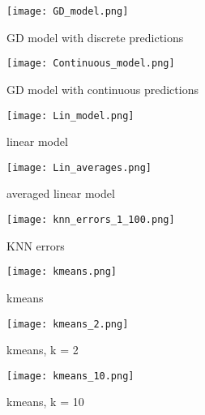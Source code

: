 \documentclass{article}
\begin{document}
\begin{figure}[h]
\centering
\texttt{[image: GD\_model.png]}
\caption{GD model with discrete predictions}
\end{figure}

\begin{figure}[h]
\centering
\texttt{[image: Continuous\_model.png]}
\caption{GD model with continuous predictions}
\end{figure}

\begin{figure}[h]
\centering
\texttt{[image: Lin\_model.png]}
\caption{linear model}
\end{figure}

\begin{figure}[h]
\centering
\texttt{[image: Lin\_averages.png]}
\caption{averaged linear model}
\end{figure}

\begin{figure}[h]
\centering
\texttt{[image: knn\_errors\_1\_100.png]}
\caption{KNN errors}
\end{figure}

\begin{figure}[h]
\centering
\texttt{[image: kmeans.png]}
\caption{kmeans}
\end{figure}

\begin{figure}[h]
\centering
\texttt{[image: kmeans\_2.png]}
\caption{kmeans, k = 2}
\end{figure}

\begin{figure}[h]
\centering
\texttt{[image: kmeans\_10.png]}
\caption{kmeans, k = 10}
\end{figure}
\end{document}
